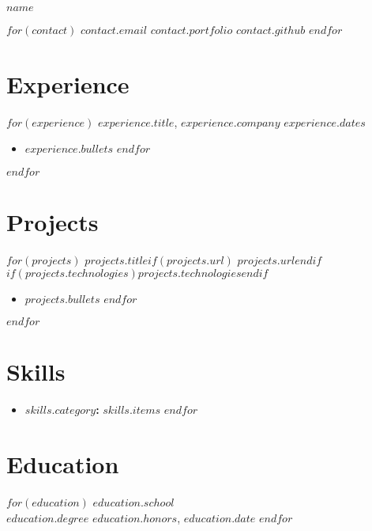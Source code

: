 \documentclass[11pt]{article}
\newcommand{\entrytitle}[1]{\vspace{0.5em}\textbf{#1}}
\begin{document}
\centerline{\Huge{$name$}}

\centerline{$for(contact)$
  $contact.email$ \textbar{} $contact.portfolio$ \textbar{} $contact.github$
$endfor$}

\section{Experience}
$for(experience)$
\entrytitle{$experience.title$}, $experience.company$ \hfill $experience.dates$ \\
\begin{itemize}
$for(experience.bullets)$
    \item $experience.bullets$
$endfor$
\end{itemize}
$endfor$

\section{Projects}
$for(projects)$
\entrytitle{$projects.title$}$if(projects.url)$ \hfill $projects.url$$endif$ \\
$if(projects.technologies)$\textit{$projects.technologies$}$endif$
\begin{itemize}
$for(projects.bullets)$
    \item $projects.bullets$
$endfor$
\end{itemize}
$endfor$

\section{Skills}
\begin{itemize}[label={},leftmargin=0em]
$for(skills)$
    \item \textbf{$skills.category$:} $skills.items$
$endfor$
\end{itemize}

\section{Education}
$for(education)$
\textbf{$education.school$} \\
$education.degree$ \hfill $education.honors$, $education.date$
$endfor$
\end{document}
